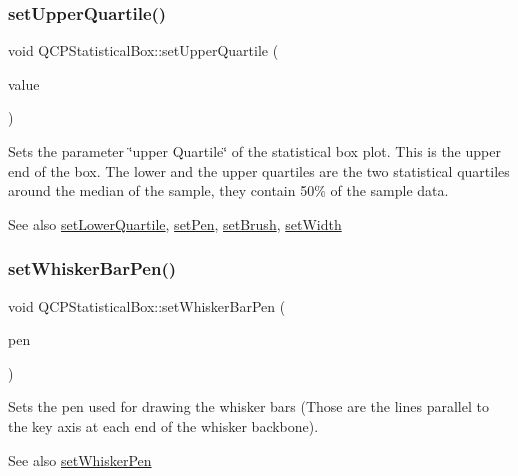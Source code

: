 \subsubsection{\texorpdfstring{set\+Upper\+Quartile()}{setUpperQuartile()}}
{\footnotesize\ttfamily void Q\+C\+P\+Statistical\+Box\+::set\+Upper\+Quartile (\begin{DoxyParamCaption}\item[{double}]{value }\end{DoxyParamCaption})}

Sets the parameter \char`\"{}upper Quartile\char`\"{} of the statistical box plot. This is the upper end of the box. The lower and the upper quartiles are the two statistical quartiles around the median of the sample, they contain 50\% of the sample data.

\begin{DoxySeeAlso}{See also}
\mbox{\hyperlink{class_q_c_p_statistical_box_a680941af5e23d902013962fa67223f9e}{set\+Lower\+Quartile}}, \mbox{\hyperlink{class_q_c_p_abstract_plottable_ab74b09ae4c0e7e13142fe4b5bf46cac7}{set\+Pen}}, \mbox{\hyperlink{class_q_c_p_abstract_plottable_a7a4b92144dca6453a1f0f210e27edc74}{set\+Brush}}, \mbox{\hyperlink{class_q_c_p_statistical_box_a0b62775bd67301b1eba5c785f2b26f14}{set\+Width}} 
\end{DoxySeeAlso}
\mbox{\label{class_q_c_p_statistical_box_aa8d3e503897788e1abf68dc74b5f147f}} 
\subsubsection{\texorpdfstring{set\+Whisker\+Bar\+Pen()}{setWhiskerBarPen()}}
{\footnotesize\ttfamily void Q\+C\+P\+Statistical\+Box\+::set\+Whisker\+Bar\+Pen (\begin{DoxyParamCaption}\item[{const Q\+Pen \&}]{pen }\end{DoxyParamCaption})}

Sets the pen used for drawing the whisker bars (Those are the lines parallel to the key axis at each end of the whisker backbone).

\begin{DoxySeeAlso}{See also}
\mbox{\hyperlink{class_q_c_p_statistical_box_a4a5034cb3b9b040444df05ab1684620b}{set\+Whisker\+Pen}} 
\end{DoxySeeAlso}
\mbox{\label{class_q_c_p_statistical_box_a4a5034cb3b9b040444df05ab1684620b}} 
